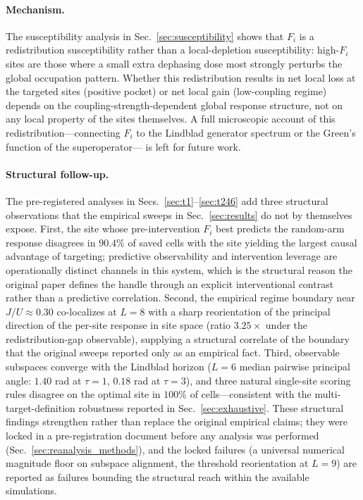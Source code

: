\documentclass[aps,prresearch,reprint,amsmath,amssymb,longbibliography,floatfix]{revtex4-2}
\newcommand{\Fi}{F_i}
\begin{document}
\paragraph*{Mechanism.}
The susceptibility analysis in Sec.~\ref{sec:susceptibility} shows that
$\Fi$ is a redistribution susceptibility rather than a local-depletion
susceptibility: high-$\Fi$ sites are those where a small extra dephasing
dose most strongly perturbs the global occupation pattern.
Whether this redistribution results in net local loss at the targeted sites
(positive pocket) or net local gain (low-coupling regime) depends on the
coupling-strength-dependent global response structure, not on any local
property of the sites themselves.
A full microscopic account of this redistribution---connecting $\Fi$ to the
Lindblad generator spectrum or the Green's function of the superoperator---
is left for future work.

\paragraph*{Structural follow-up.}
The pre-registered analyses in Secs.~\ref{sec:t1}--\ref{sec:t246} add
three structural observations that the empirical sweeps in
Sec.~\ref{sec:results} do not by themselves expose.
First, the site whose pre-intervention $\Fi$ best predicts the
random-arm response disagrees in $90.4\%$ of saved cells with the site
yielding the largest causal advantage of targeting; predictive
observability and intervention leverage are operationally distinct
channels in this system, which is the structural reason the original
paper defines the handle through an explicit interventional contrast
rather than a predictive correlation.
Second, the empirical regime boundary near $J/U\approx 0.30$
co-localizes at $L=8$ with a sharp reorientation of the principal
direction of the per-site response in site space (ratio $3.25\times$
under the redistribution-gap observable), supplying a structural
correlate of the boundary that the original sweeps reported only as an
empirical fact.
Third, observable subspaces converge with the Lindblad horizon
($L=6$ median pairwise principal angle: $1.40$ rad at $\tau=1$,
$0.18$ rad at $\tau=3$), and three natural single-site scoring rules
disagree on the optimal site in $100\%$ of cells---consistent with the
multi-target-definition robustness reported in
Sec.~\ref{sec:exhaustive}.
These structural findings strengthen rather than replace the original
empirical claims; they were locked in a pre-registration document
before any analysis was performed (Sec.~\ref{sec:reanalysis_methods}),
and the locked failures (a universal numerical magnitude floor on
subspace alignment, the threshold reorientation at $L=9$) are reported
as failures bounding the structural reach within the available
simulations.
\end{document}
